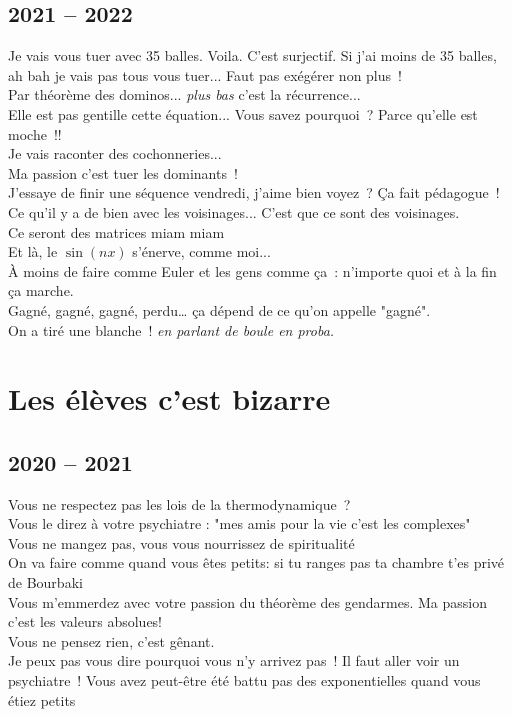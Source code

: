\documentclass[french, a4paper, openany]{book}
\begin{document}
	\subsection*{2021 -- 2022}
		\noindent \og Je vais vous tuer avec 35 balles. Voila. C'est surjectif. Si j'ai moins de 35 balles, ah bah je vais pas tous vous tuer... Faut pas exégérer non plus~! \fg \\
		\og Par théorème des dominos... \emph{plus bas} c'est la récurrence... \fg \\
		\og Elle est pas gentille cette équation... Vous savez pourquoi~? Parce qu'elle est moche~!! \fg \\
		\og Je vais raconter des cochonneries... \fg \\
		\og Ma passion c'est tuer les dominants~! \fg \\
		\og J'essaye de finir une séquence vendredi, j'aime bien voyez~? Ça fait pédagogue~! \fg \\
		\og Ce qu'il y a de bien avec les voisinages... C'est que ce sont des voisinages. \fg \\
		\og Ce seront des matrices miam miam \fg \\
		\og Et là, le $\sin (nx)$ s'énerve, comme moi... \fg \\
		\og À moins de faire comme Euler et les gens comme ça~: n'importe quoi et à la fin ça marche. \fg \\
		\og Gagné, gagné, gagné, perdu… ça dépend de ce qu'on appelle "gagné". \fg \\
		\og On a tiré une blanche~! \emph{en parlant de boule en proba.} \fg \\

\section*{Les élèves c'est bizarre}

	\subsection*{2020 -- 2021}
		\noindent \og Vous ne respectez pas les lois de la thermodynamique~? \fg \\
		\og Vous le direz à votre psychiatre : "mes amis pour la vie c'est les complexes" \fg \\
		\og Vous ne mangez pas, vous vous nourrissez de spiritualité \fg \\
		\og On va faire comme quand vous êtes petits: si tu ranges pas ta chambre t'es privé de Bourbaki \fg \\
		\og Vous m'emmerdez avec votre passion du théorème des gendarmes. Ma passion c'est les valeurs absolues! \fg \\
		\og Vous ne pensez rien, c'est gênant. \fg \\
		\og Je peux pas vous dire pourquoi vous n'y arrivez pas~! Il faut aller voir un psychiatre~! Vous avez peut-être été battu pas des exponentielles quand vous étiez petits \fg \\
	
\end{document}
